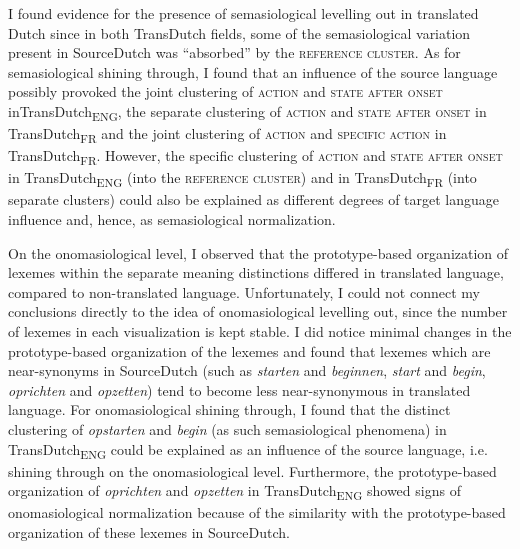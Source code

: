 I found evidence for the presence of semasiological levelling out in translated Dutch since in both TransDutch fields, some of the semasiological variation present in SourceDutch was ``absorbed'' by the \textsc{reference cluster}. As for semasiological shining through, I found that an influence of the source language possibly provoked the joint clustering of \textsc{action} and \textsc{state after onset} in\linebreak TransDutch\textsubscript{ENG}, the separate clustering of \textsc{action} and \textsc{state after onset} in Trans\-Dutch\textsubscript{FR} and the joint clustering of \textsc{action} and {\textsc{specific}} \textsc{action} in Trans\-Dutch\textsubscript{FR}. However, the specific clustering of \textsc{action} and \textsc{state after onset} in TransDutch\textsubscript{ENG} (into the \textsc{reference cluster}) and in TransDutch\textsubscript{FR} (into separate clusters) could also be explained as different degrees of target language influence and, hence, as semasiological normalization.

On the onomasiological level, I observed that the prototype-based organization of lexemes within the separate meaning distinctions differed in translated language, compared to non-translated language. Unfortunately, I could not connect my conclusions directly to the idea of onomasiological levelling out, since the number of lexemes in each visualization is kept stable. I did notice minimal changes in the prototype-based organization of the lexemes and found that lexemes which are near-synonyms in SourceDutch (such as \textit{starten} and \textit{beginnen}, \textit{start} and \textit{begin}, \textit{oprichten} and \textit{opzetten}) tend to become less near-synonymous in translated language. For onomasiological shining through, I found that the distinct clustering of \textit{opstarten} and \textit{begin} (as such semasiological phenomena) in TransDutch\textsubscript{ENG} could be explained as an influence of the source language, i.e. shining through on the onomasiological level. Furthermore, the prototype-based organization of \textit{oprichten} and \textit{opzetten} in TransDutch\textsubscript{ENG} showed signs of onomasiological normalization because of the similarity with the prototype-based organization of these lexemes in SourceDutch.

